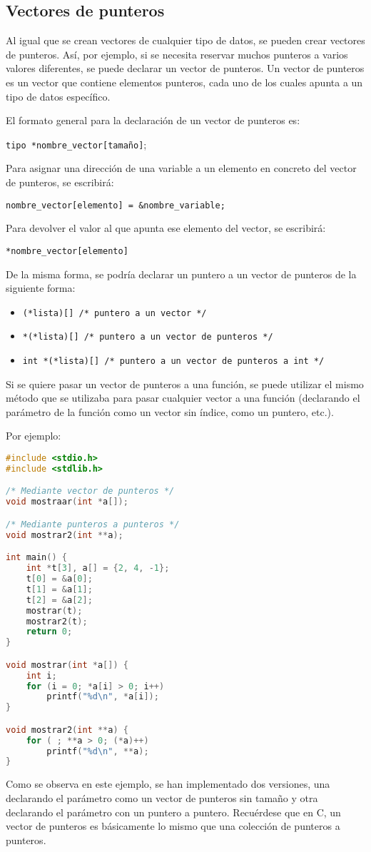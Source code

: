 \subsection{Vectores de punteros}{
Al igual que se crean vectores de cualquier tipo de datos, se pueden crear vectores de punteros. Así, por ejemplo, si se necesita reservar muchos punteros a varios valores diferentes, se puede declarar un vector de punteros. Un vector de punteros es un vector que contiene elementos punteros, cada uno de los cuales apunta a un tipo de datos específico.

El formato general para la declaración de un vector de punteros es:

\texttt{tipo *nombre\_vector[tamaño]};

Para asignar una dirección de una variable a un elemento en concreto del vector de punteros, se escribirá:

\texttt{nombre\_vector[elemento] = \&nombre\_variable;}

Para devolver el valor al que apunta ese elemento del vector, se escribirá:

\texttt{*nombre\_vector[elemento]}

De la misma forma, se podría declarar un puntero a un vector de punteros de la siguiente forma:
\begin{itemize}
	\item \texttt{(*lista)[] /* puntero a un vector */}
	\item \texttt{*(*lista)[] /* puntero a un vector de punteros */}
	\item \texttt{int *(*lista)[] /* puntero a un vector de punteros a int */}
\end{itemize}
Si se quiere pasar un vector de punteros a una función, se puede utilizar el mismo método que se utilizaba para pasar cualquier vector a una función (declarando el parámetro de la función como un vector sin índice, como un puntero, etc.).

Por ejemplo:
\begin{Ejemplo}
\begin{lstlisting}[language=C]
#include <stdio.h>
#include <stdlib.h>

/* Mediante vector de punteros */
void mostraar(int *a[]);

/* Mediante punteros a punteros */
void mostrar2(int **a);

int main() {
    int *t[3], a[] = {2, 4, -1};
    t[0] = &a[0];
    t[1] = &a[1];
    t[2] = &a[2];
    mostrar(t);
    mostrar2(t);
    return 0;
}

void mostrar(int *a[]) {
    int i;
    for (i = 0; *a[i] > 0; i++)
        printf("%d\n", *a[i]);
}

void mostrar2(int **a) {
    for ( ; **a > 0; (*a)++)
        printf("%d\n", **a);
}
\end{lstlisting}
\Explicacion
Como se observa en este ejemplo, se han implementado dos versiones, una declarando el parámetro como un vector de punteros sin tamaño y otra declarando el parámetro con un puntero a puntero. Recuérdese que en C, un vector de punteros es básicamente lo mismo que una colección de punteros a punteros.
\end{Ejemplo}
}

